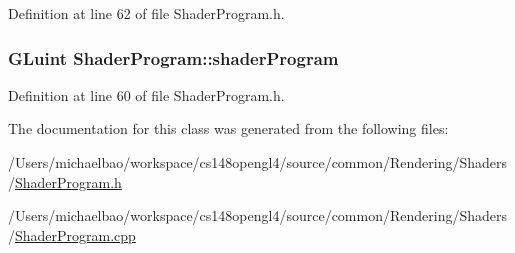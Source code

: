Definition at line 62 of file Shader\+Program.\+h.

\hypertarget{class_shader_program_a7d8f2b643a81ac4097606e43ade92f81}{}
\subsubsection[{shader\+Program}]{\setlength{\rightskip}{0pt plus 5cm}G\+Luint Shader\+Program\+::shader\+Program\hspace{0.3cm}{\ttfamily [protected]}}\label{class_shader_program_a7d8f2b643a81ac4097606e43ade92f81}


Definition at line 60 of file Shader\+Program.\+h.



The documentation for this class was generated from the following files\+:\begin{DoxyCompactItemize}
\item 
/\+Users/michaelbao/workspace/cs148opengl4/source/common/\+Rendering/\+Shaders/\hyperlink{_shader_program_8h}{Shader\+Program.\+h}\item 
/\+Users/michaelbao/workspace/cs148opengl4/source/common/\+Rendering/\+Shaders/\hyperlink{_shader_program_8cpp}{Shader\+Program.\+cpp}\end{DoxyCompactItemize}
